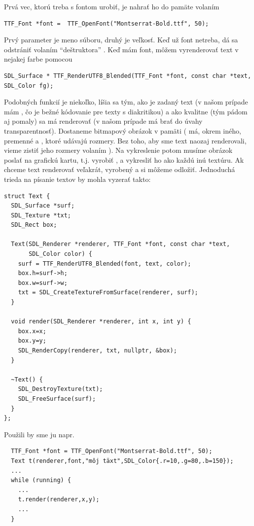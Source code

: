 Prvá vec, ktorú treba s fontom urobiť, je nahrať ho do pamäte volaním

\begin{lstlisting}
TTF_Font *font =  TTF_OpenFont("Montserrat-Bold.ttf", 50);
\end{lstlisting}

Prvý parameter je meno súboru, druhý je veľkosť. Keď už font netreba, dá sa odstrániť volaním ``deštruktora'' .
Keď mám font, môžem vyrenderovať text v nejakej farbe pomocou

\begin{lstlisting}
SDL_Surface * TTF_RenderUTF8_Blended(TTF_Font *font, const char *text, SDL_Color fg);
\end{lstlisting}

Podobných funkcií je niekoľko, líšia sa tým, ako je zadaný text (v našom prípade mám , čo je bežné kódovanie pre texty s diakritikou) a ako kvalitne (tým pádom aj pomaly)
sa má renderovať (v našom prípade má brať do úvahy transparentnosť). Dostaneme bitmapový obrázok v pamäti ( má, okrem iného, premenné  a , 
ktoré udávajú rozmery. Bez toho, aby sme text naozaj renderovali, vieme zistiť jeho rozmery volaním ).
Na vykreslenie potom musíme obrázok poslať na grafickú kartu, t.j. vyrobiť , a vykresliť ho ako každú inú textúru. Ak chceme text renderovať veľakrát, 
vyrobený  a  si môžeme odložiť. Jednoduchá trieda na písanie textov by mohla vyzerať takto:\\

\begin{lstlisting}
struct Text {
  SDL_Surface *surf;
  SDL_Texture *txt;
  SDL_Rect box;

  Text(SDL_Renderer *renderer, TTF_Font *font, const char *text,
       SDL_Color color) {
    surf = TTF_RenderUTF8_Blended(font, text, color);
    box.h=surf->h;
    box.w=surf->w;
    txt = SDL_CreateTextureFromSurface(renderer, surf);
  }

  void render(SDL_Renderer *renderer, int x, int y) {
    box.x=x;
    box.y=y;
    SDL_RenderCopy(renderer, txt, nullptr, &box);
  }

  ~Text() {
    SDL_DestroyTexture(txt);
    SDL_FreeSurface(surf);
  }
};
\end{lstlisting}

Použili by sme ju napr.

\begin{lstlisting}
  TTF_Font *font = TTF_OpenFont("Montserrat-Bold.ttf", 50);
  Text t(renderer,font,"môj täxt",SDL_Color{.r=10,.g=80,.b=150});
  ...
  while (running) {
    ...
    t.render(renderer,x,y);
    ...
  }
\end{lstlisting}

